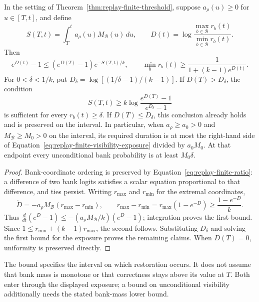 \begin{theorem}
\enforcehalffinalproseline
\label{thm:replay-finite-recovery}
In the setting of Theorem~\ref{thm:replay-finite-threshold}, suppose
$a_\rho(u)\ge0$ for $u\in[T,t]$, and define
\[
 S(T,t)=\int_T^t a_\rho(u)M_{\mathcal B}(u)\,du,
 \qquad D(t)=\log\frac{\max_{b\in\mathcal B}r_b(t)}
                            {\min_{b\in\mathcal B}r_b(t)}.
\]
Then
\begin{equation}
 e^{D(t)}-1\le(e^{D(T)}-1)e^{-S(T,t)/k},
 \qquad
 \min_b r_b(t)\ge\frac{1}{1+(k-1)e^{D(t)}}.
 \label{eq:replay-finite-recovery}
\end{equation}
For $0<\delta<1/k$, put
$D_\delta=\log[(1/\delta-1)/(k-1)]$. If $D(T)>D_\delta$, the condition
\begin{equation}
 S(T,t)\ge k\log\frac{e^{D(T)}-1}{e^{D_\delta}-1}
 \label{eq:replay-finite-visibility-exposure}
\end{equation}
is sufficient for every $r_b(t)\ge\delta$. If $D(T)\le D_\delta$, this
conclusion already holds and is preserved on the interval. In particular,
when $a_\rho\ge a_0>0$ and $M_{\mathcal B}\ge M_0>0$ on the interval,
its required duration is at most the right-hand side of
Equation~\eqref{eq:replay-finite-visibility-exposure} divided by $a_0M_0$.
At that endpoint every unconditional bank probability is at least
$M_0\delta$.
\end{theorem}

\begin{proof}
\enforcehalffinalproseline
Bank-coordinate ordering is preserved by
Equation~\eqref{eq:replay-finite-ratio}: a difference of two bank logits
satisfies a scalar equation proportional to that difference, and ties persist.
Writing $r_{\max}$ and $r_{\min}$ for the extremal coordinates,
\[
 \dot D=-a_\rho M_{\mathcal B}(r_{\max}-r_{\min}),
 \qquad
 r_{\max}-r_{\min}
   =r_{\max}(1-e^{-D})\ge\frac{1-e^{-D}}{k}.
\]
Thus $\frac{d}{dt}(e^D-1)\le
 -(a_\rho M_{\mathcal B}/k)(e^D-1)$; integration proves the first bound.
Since $1\le r_{\min}+(k-1)r_{\max}$, the second follows. Substituting
$D_\delta$ and solving the first bound for the exposure proves the remaining
claims. When $D(T)=0$, uniformity is preserved directly.
\end{proof}

The bound specifies the interval on which restoration occurs. It does not
assume that bank mass is monotone or that correctness stays above its value
at $T$. Both enter through the displayed exposure; a bound on unconditional
visibility additionally needs the stated bank-mass lower bound.

